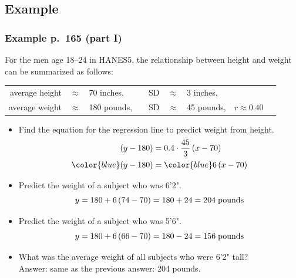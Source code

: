\documentclass[t]{beamer}
\begin{document}
\subsection{Example}
\begin{frame}
\frametitle{Example p.\ 165 (part I)}

\footnotesize 

For the men age 18--24 in HANES5, the relationship between height and 
weight can be summarized as follows:\vspace{-3pt}
\begin{center}
{\setlength{\tabcolsep}{2pt}\begin{tabular}{rclcrclcc}
average height & $\approx$ & 70 inches, & \hspace{5pt} & SD & $\approx$ & 3 inches,\\
average weight & $\approx$ & 180 pounds, & \hspace{5pt} & SD & $\approx$ & 45 pounds, &
   \hspace{10pt} $r\approx 0.40$\\[-8pt]
\end{tabular}}
\end{center}
\begin{itemize}
\item<2-> Find the equation for the regression line to predict weight from height.\vspace{-5pt}
  \begin{align*}
  (y - 180) &= 0.4\cdot \frac{45}{3}\,(x - 70)\\[1pt]
{\color{blue}  (y - 180)} &= {\color{blue}6\,(x - 70)}\vspace{-8pt}
\end{align*}
\item<3-> Predict the weight of a subject who was 6'2".\vspace{-5pt}
    \[y = 180 + 6\,(74 - 70) = 180 + 24 = 204\;\mbox{pounds}\vspace{-5pt}\]
\item<4-> Predict the weight of a subject who was 5'6".\vspace{-5pt}
    \[y = 180 + 6\,(66 - 70) = 180 - 24 = 156\;\mbox{pounds}\vspace{-5pt}\]
\item<5-> What was the average weight of all subjects  who were 6'2" tall?\\
    Answer:  same as the previous answer:  204 pounds.
\end{itemize}
\end{frame}
\end{document}

